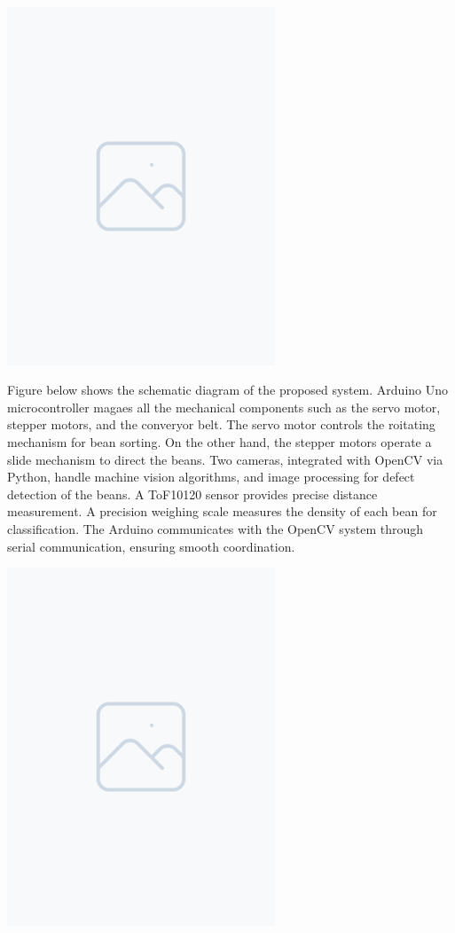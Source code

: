 \includegraphics[width=0.6\textwidth]{figure/placeholder.png} 

Figure below shows the schematic diagram of the proposed system. Arduino Uno microcontroller magaes all the mechanical components such as the servo motor, stepper motors, and the converyor belt. The servo motor controls the  roitating mechanism for bean sorting. On the other hand, the stepper motors operate a slide mechanism to direct the beans. Two cameras, integrated with OpenCV via Python, handle machine vision algorithms, and image processing for defect detection of the beans. A ToF10120 sensor provides precise distance measurement. A precision weighing scale measures the density of each bean for classification. The Arduino communicates with the OpenCV system through serial communication, ensuring smooth coordination.

\includegraphics[width=0.6\textwidth]{figure/placeholder.png} 

